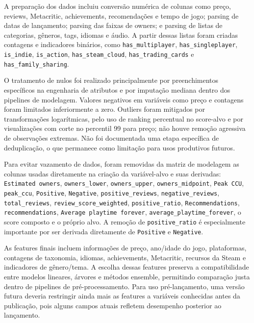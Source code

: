 \documentclass[12pt]{article}
\begin{document}
A preparação dos dados incluiu conversão numérica de colunas como preço, reviews, Metacritic, achievements, recomendações e tempo de jogo; parsing de datas de lançamento; parsing das faixas de owners; e parsing de listas de categorias, gêneros, tags, idiomas e áudio. A partir dessas listas foram criadas contagens e indicadores binários, como \texttt{has\_multiplayer}, \texttt{has\_singleplayer}, \texttt{is\_indie}, \texttt{is\_action}, \texttt{has\_steam\_cloud}, \texttt{has\_trading\_cards} e \texttt{has\_family\_sharing}.

O tratamento de nulos foi realizado principalmente por preenchimentos específicos na engenharia de atributos e por imputação mediana dentro dos pipelines de modelagem. Valores negativos em variáveis como preço e contagens foram limitados inferiormente a zero. Outliers foram mitigados por transformações logarítmicas, pelo uso de ranking percentual no score-alvo e por visualizações com corte no percentil 99 para preço; não houve remoção agressiva de observações extremas. Não foi documentada uma etapa específica de deduplicação, o que permanece como limitação para usos produtivos futuros.

Para evitar vazamento de dados, foram removidas da matriz de modelagem as colunas usadas diretamente na criação da variável-alvo e suas derivadas: \texttt{Estimated owners}, \texttt{owners\_lower}, \texttt{owners\_upper}, \texttt{owners\_midpoint}, \texttt{Peak CCU}, \texttt{peak\_ccu}, \texttt{Positive}, \texttt{Negative}, \texttt{positive\_reviews}, \texttt{negative\_reviews}, \texttt{total\_reviews}, \texttt{review\_score\_weighted}, \texttt{positive\_ratio}, \texttt{Recommendations}, \texttt{recommendations}, \texttt{Average playtime forever}, \texttt{average\_playtime\_forever}, o score composto e o próprio alvo. A remoção de \texttt{positive\_ratio} é especialmente importante por ser derivada diretamente de \texttt{Positive} e \texttt{Negative}.

As features finais incluem informações de preço, ano/idade do jogo, plataformas, contagens de taxonomia, idiomas, achievements, Metacritic, recursos da Steam e indicadores de gênero/tema. A escolha dessas features preserva a compatibilidade entre modelos lineares, árvores e métodos ensemble, permitindo comparação justa dentro de pipelines de pré-processamento. Para uso pré-lançamento, uma versão futura deveria restringir ainda mais as features a variáveis conhecidas antes da publicação, pois alguns campos atuais refletem desempenho posterior ao lançamento.
\end{document}
